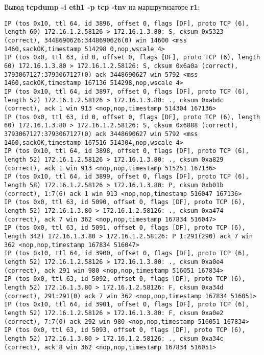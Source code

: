 \documentclass[a4paper,12pt]{article}
\begin{document}
Вывод \textbf{tcpdump -i eth1 -p tcp -tnv}  на маршрутизаторе \textbf{r1}:
\begin{Verbatim}
IP (tos 0x10, ttl 64, id 3896, offset 0, flags [DF], proto TCP (6), length 60) 172.16.1.2.58126 > 172.16.1.3.80: S, cksum 0x5323 (correct), 3448690626:3448690626(0) win 14600 <mss 1460,sackOK,timestamp 514298 0,nop,wscale 4>
IP (tos 0x0, ttl 63, id 0, offset 0, flags [DF], proto TCP (6), length 60) 172.16.1.3.80 > 172.16.1.2.58126: S, cksum 0x6a0a (correct), 3793067127:3793067127(0) ack 3448690627 win 5792 <mss 1460,sackOK,timestamp 167136 514298,nop,wscale 4>
IP (tos 0x10, ttl 64, id 3897, offset 0, flags [DF], proto TCP (6), length 52) 172.16.1.2.58126 > 172.16.1.3.80: ., cksum 0xabdc (correct), ack 1 win 913 <nop,nop,timestamp 514304 167136>
IP (tos 0x0, ttl 63, id 0, offset 0, flags [DF], proto TCP (6), length 60) 172.16.1.3.80 > 172.16.1.2.58126: S, cksum 0x6888 (correct), 3793067127:3793067127(0) ack 3448690627 win 5792 <mss 1460,sackOK,timestamp 167516 514304,nop,wscale 4>
IP (tos 0x10, ttl 64, id 3898, offset 0, flags [DF], proto TCP (6), length 52) 172.16.1.2.58126 > 172.16.1.3.80: ., cksum 0xa829 (correct), ack 1 win 913 <nop,nop,timestamp 515251 167136>
IP (tos 0x10, ttl 64, id 3899, offset 0, flags [DF], proto TCP (6), length 58) 172.16.1.2.58126 > 172.16.1.3.80: P, cksum 0xb01b (correct), 1:7(6) ack 1 win 913 <nop,nop,timestamp 516047 167136>
IP (tos 0x0, ttl 63, id 5090, offset 0, flags [DF], proto TCP (6), length 52) 172.16.1.3.80 > 172.16.1.2.58126: ., cksum 0xa474 (correct), ack 7 win 362 <nop,nop,timestamp 167834 516047>
IP (tos 0x0, ttl 63, id 5091, offset 0, flags [DF], proto TCP (6), length 342) 172.16.1.3.80 > 172.16.1.2.58126: P 1:291(290) ack 7 win 362 <nop,nop,timestamp 167834 516047>
IP (tos 0x10, ttl 64, id 3900, offset 0, flags [DF], proto TCP (6), length 52) 172.16.1.2.58126 > 172.16.1.3.80: ., cksum 0xa0e4 (correct), ack 291 win 980 <nop,nop,timestamp 516051 167834>
IP (tos 0x0, ttl 63, id 5092, offset 0, flags [DF], proto TCP (6), length 52) 172.16.1.3.80 > 172.16.1.2.58126: F, cksum 0xa34d (correct), 291:291(0) ack 7 win 362 <nop,nop,timestamp 167834 516051>
IP (tos 0x10, ttl 64, id 3901, offset 0, flags [DF], proto TCP (6), length 52) 172.16.1.2.58126 > 172.16.1.3.80: F, cksum 0xa0e2 (correct), 7:7(0) ack 292 win 980 <nop,nop,timestamp 516051 167834>
IP (tos 0x0, ttl 63, id 5093, offset 0, flags [DF], proto TCP (6), length 52) 172.16.1.3.80 > 172.16.1.2.58126: ., cksum 0xa34c (correct), ack 8 win 362 <nop,nop,timestamp 167834 516051>
\end{Verbatim}
\end{document}
